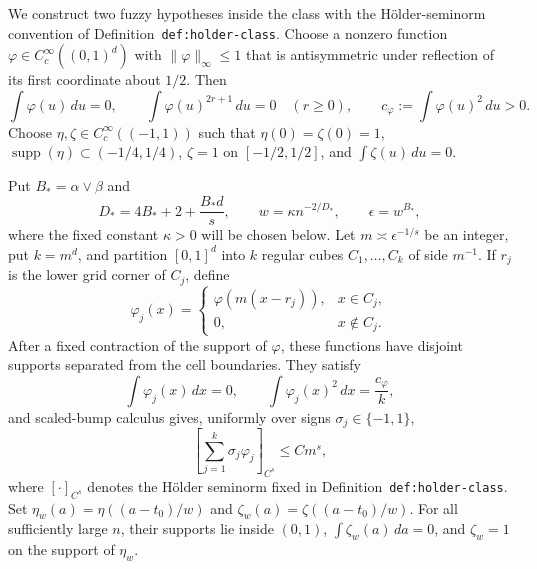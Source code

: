 We construct two fuzzy hypotheses inside the class with the H\"older-seminorm convention of Definition~\texttt{def:holder-class}. Choose a nonzero function \(\varphi\in C_c^\infty((0,1)^d)\) with \(\lVert\varphi\rVert_\infty\le1\) that is antisymmetric under reflection of its first coordinate about \(1/2\). Then
\[
\int\varphi(u)\,du=0,
\qquad
\int\varphi(u)^{2r+1}\,du=0\quad(r\ge0),
\qquad
c_\varphi:=\int\varphi(u)^2\,du>0.
\]
Choose \(\eta,\zeta\in C_c^\infty((-1,1))\) such that \(\eta(0)=\zeta(0)=1\), \(\operatorname{supp}(\eta)\subset(-1/4,1/4)\), \(\zeta=1\) on \([-1/2,1/2]\), and \(\int\zeta(u)\,du=0\).

Put \(B_*=\alpha\vee\beta\) and
\[
D_*=4B_*+2+\frac{B_*d}{s},
\qquad
w=\kappa n^{-2/D_*},
\qquad
\epsilon=w^{B_*},
\]
where the fixed constant \(\kappa>0\) will be chosen below. Let \(m\asymp\epsilon^{-1/s}\) be an integer, put \(k=m^d\), and partition \([0,1]^d\) into \(k\) regular cubes \(C_1,\ldots,C_k\) of side \(m^{-1}\). If \(r_j\) is the lower grid corner of \(C_j\), define
\[
\varphi_j(x)=
\begin{cases}
\varphi(m(x-r_j)),&x\in C_j,\\
0,&x\notin C_j.
\end{cases}
\]
After a fixed contraction of the support of \(\varphi\), these functions have disjoint supports separated from the cell boundaries. They satisfy
\[
\int\varphi_j(x)\,dx=0,
\qquad
\int\varphi_j(x)^2\,dx=\frac{c_\varphi}{k},
\]
and scaled-bump calculus gives, uniformly over signs \(\sigma_j\in\{-1,1\}\),
\[
\left[\sum_{j=1}^k\sigma_j\varphi_j\right]_{C^s}
\le C m^s,
\]
where \([\cdot]_{C^s}\) denotes the H\"older seminorm fixed in Definition~\texttt{def:holder-class}. Set \(\eta_w(a)=\eta((a-t_0)/w)\) and \(\zeta_w(a)=\zeta((a-t_0)/w)\). For all sufficiently large \(n\), their supports lie inside \((0,1)\), \(\int\zeta_w(a)\,da=0\), and \(\zeta_w=1\) on the support of \(\eta_w\).


